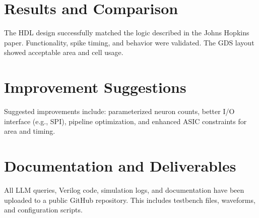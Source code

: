 \documentclass[12pt]{article}
\begin{document}
\section{Results and Comparison}
The HDL design successfully matched the logic described in the Johns Hopkins paper. Functionality, spike timing, 
and behavior were validated. The GDS layout showed acceptable area and cell usage.

\section{Improvement Suggestions}
Suggested improvements include: parameterized neuron counts, better I/O interface (e.g., SPI), pipeline optimization, 
and enhanced ASIC constraints for area and timing.

\section{Documentation and Deliverables}
All LLM queries, Verilog code, simulation logs, and documentation have been uploaded to a public GitHub repository. 
This includes testbench files, waveforms, and configuration scripts.
\end{document}

